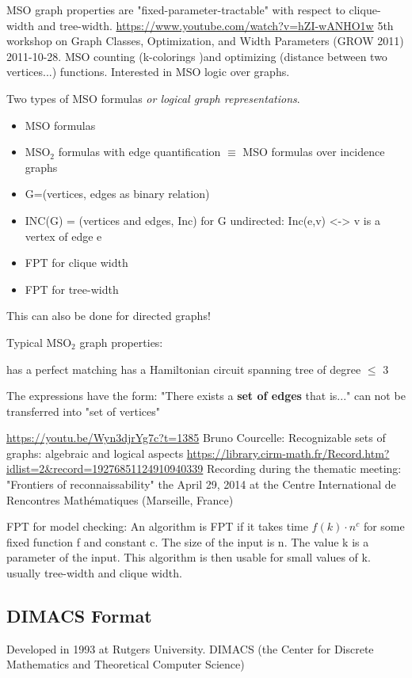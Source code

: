 \documentclass[a4paper, 12pt]{scrartcl}
\begin{document}
MSO graph properties are "fixed-parameter-tractable" with respect to clique-width and tree-width. 
\url{https://www.youtube.com/watch?v=hZI-wANHO1w} 5th workshop on Graph Classes, Optimization, and Width Parameters (GROW 2011)
2011-10-28.
MSO counting (k-colorings )and optimizing (distance between two vertices...) functions.
Interested in MSO logic over graphs.

Two types of MSO formulas \textit{or logical graph representations}.
\begin{itemize}
	\item MSO formulas
	\item MSO$_{2}$ formulas with edge quantification $\equiv$ MSO formulas over incidence graphs
\end{itemize}
\begin{itemize}
	\item G=(vertices, edges as binary relation)
	\item INC(G) = (vertices and edges, Inc)
		for G undirected: Inc(e,v) <-> v is a vertex of edge e
\end{itemize}
\begin{itemize}
	\item FPT for clique width
	\item FPT for tree-width
\end{itemize}
This can also be done for directed graphs!

Typical MSO$_{2}$ graph properties:

has a perfect matching
has a Hamiltonian circuit
spanning tree of degree $\le$ 3

The expressions have the form: "There exists a \textbf{set of edges} that is..." can not be transferred into "set of vertices"

\url{https://youtu.be/Wyn3djrYg7c?t=1385} Bruno Courcelle: Recognizable sets of graphs: algebraic and logical aspects 
\url{https://library.cirm-math.fr/Record.htm?idlist=2&record=19276851124910940339}
Recording during the thematic meeting: "Frontiers of reconnaissability" the April 29, 2014 at the Centre International de Rencontres Mathématiques (Marseille, France)

FPT for model checking:
An algorithm is FPT if it takes time $f(k)\cdot n^{c}$ for some fixed function f and constant c. The size of the input is n. 
The value k is a parameter of the input. 
This algorithm is then usable for small values of k. usually tree-width and clique width.


\subsection{DIMACS Format}
Developed in 1993 at Rutgers University.
DIMACS (the Center for Discrete Mathematics and Theoretical Computer Science)
\end{document}

